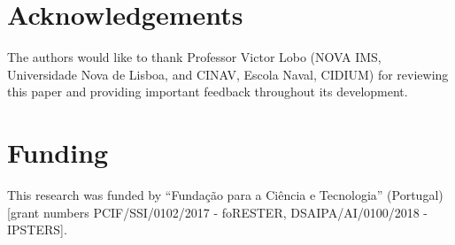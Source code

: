 \documentclass[preprint,12pt]{elsarticle}
\begin{document}
\section{Acknowledgements}

The authors would like to thank Professor Victor Lobo (NOVA IMS, Universidade
Nova de Lisboa, and CINAV, Escola Naval, CIDIUM) for reviewing this paper and
providing important feedback throughout its development.

\section{Funding}

This research was funded by ``Fundação para a Ciência e Tecnologia''
(Portugal) [grant numbers PCIF/SSI/0102/2017 - foRESTER, DSAIPA/AI/0100/2018 -
IPSTERS].



\end{document}

